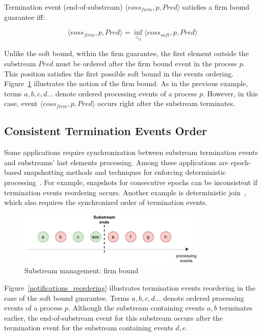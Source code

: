 \begin{definition}
Termination event (end-of-substream) $\langle eoss_{firm}, p, Pred\rangle$ satisfies a firm bound guarantee iff:

\begin{equation}
\langle eoss_{firm}, p, Pred\rangle = \inf_{<_p} \langle eoss_{soft}, p, Pred\rangle
\end{equation}
\end{definition}

Unlike the soft bound, within the firm guarantee, the first element outside the substream $Pred$ must be ordered after the firm bound event in the process $p$. This position satisfies the first possible soft bound in the events ordering. Figure~\ref{strict_guarantees} illustrates the notion of the firm bound. As in the previous example, terms $a,b,c,d...$ denote ordered processing events of a process $p$. However, in this case, event $\langle eoss_{firm}, p, Pred\rangle$ occurs right after the substream terminates.

\subsection{Consistent Termination Events Order}
Some applications require synchronization between substream termination events and substreams' last elements processing. Among these applications are epoch-based snapshotting methods and techniques for enforcing deterministic processing~\cite{we2018adbis}. For example, snapshots for consecutive epochs can be inconsistent if termination events reordering occurs. Another example is deterministic join~\cite{gulisano2016scalejoin}, which also requires the synchronized order of termination events.

\begin{figure}[t]
  \centering
  \includegraphics[width=0.80\textwidth]{Chapters/SubstreamConsistency/pics/strict-guarantee.pdf}
  \caption{Substream management: firm bound}
  \label{strict_guarantees}
\end{figure}

Figure~\ref{notifications_reordering} illustrates termination events reordering in the case of the soft bound guarantee. Terms $a,b,c,d...$ denote ordered processing events of a process $p$. Although the substream containing events $a,b$ terminates earlier, the end-of-substream event for this substream occurs after the termination event for the substream containing events $d,e$. 

